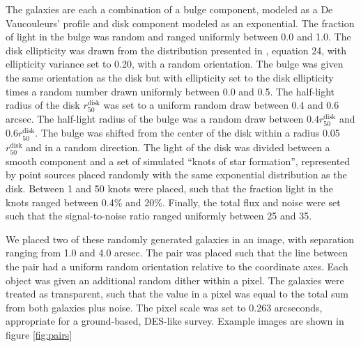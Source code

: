 \documentclass[fleqn,useAMS,usenatbib]{mnras}
\begin{document}
The galaxies are each a combination of a bulge component, modeled as a De
Vaucouleurs' profile \citep{devauc1948} and disk component modeled as an
exponential. The fraction of light in the bulge was random and ranged uniformly
between 0.0 and 1.0. The disk ellipticity was drawn from the distribution
presented in \cite{ba14}, equation 24, with ellipticity variance set to 0.20,
with a random orientation. The bulge was given the same orientation as the disk
but with ellipticity set to the disk ellipticity times a random number drawn
uniformly between 0.0 and 0.5. The half-light radius of the disk
$r_{50}^{\mathrm{disk}}$ was set to a uniform random draw between 0.4 and 0.6
arcsec. The half-light radius of the bulge was a random draw between $0.4
r_{50}^{\mathrm{disk}}$ and $0.6 r_{50}^{\mathrm{disk}}$. The bulge was shifted
from the center of the disk within a radius 0.05$r_{50}^{\mathrm{disk}}$ and in
a random direction. The light of the disk was divided between a smooth component
and a set of simulated ``knots of star formation'', represented by point sources
placed randomly with the same exponential distribution as the disk.  Between 1
and 50 knots were placed, such that the fraction light in the knots ranged
between 0.4\% and 20\%. Finally, the total flux and noise were set such that the
signal-to-noise ratio ranged uniformly between 25 and 35.

We placed two of these randomly generated galaxies in an image, with separation
ranging from 1.0 and 4.0 arcsec. The pair was placed such that the line
between the pair had a uniform random orientation relative to the coordinate
axes. Each object was given an additional random dither within a pixel. The
galaxies were treated as transparent, such that the value in a pixel was equal
to the total sum from both galaxies plus noise. The pixel scale was set to 0.263
arcseconds, appropriate for a ground-based, DES-like survey. Example images are
shown in figure \ref{fig:pairs}
\end{document}
